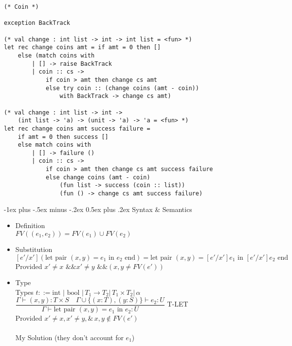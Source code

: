 \documentclass[12pt]{article}
\makeatletter
\renewcommand{\section}{\@startsection{section}{1}{0mm}%
                                    {-1ex plus -.5ex minus -.2ex}%
                                    {0.5ex plus .2ex}%
                                    {\normalfont\large\bfseries\color{header}}}
\makeatother
\begin{document}
\begin{multicols}{2}
\columnbreak

\begin{lstlisting}
(* Coin *)

exception BackTrack

(* val change : int list -> int -> int list = <fun> *)
let rec change coins amt = if amt = 0 then []
    else (match coins with 
        | [] -> raise BackTrack
        | coin :: cs ->
            if coin > amt then change cs amt
            else try coin :: (change coins (amt - coin)) 
                with BackTrack -> change cs amt)

(* val change : int list -> int -> 
    (int list -> 'a) -> (unit -> 'a) -> 'a = <fun> *)
let rec change coins amt success failure = 
    if amt = 0 then success []
    else match coins with
        | [] -> failure ()
        | coin :: cs -> 
            if coin > amt then change cs amt success failure
            else change coins (amt - coin)
                (fun list -> success (coin :: list))
                (fun () -> change cs amt success failure)
\end{lstlisting}

\section{Syntax \& Semantics}

\begin{itemize}[noitemsep, nosep]
    \item Definition \\
    $FV((e_1, e_2)) = FV(e_1) \cup FV(e_2)$
    \item Substitution \\
    $[e'/x'](\text{let pair } (x, y) = e_1 \text{ in } e_2 \text{ end}) = \text{let pair } (x, y) = [e'/x']e_1 \text{ in } [e'/x']e_2 \text{ end}$ \\
    Provided $x' \ne x \text{ \&\& } x' \ne y \text{ \&\& } (x, y \ne FV(e'))$
    \item Type \\
    Types $t ::= \text{int } \vert \text{ bool } \vert \, T_1 \rightarrow T_2 \vert \, T_1 \times T_2 \vert \, \alpha$ \\
    $\dfrac{\Gamma \vdash (x, y): T \times S \quad \Gamma \cup \{(x: T), (y: S)\} \vdash e_2: U}{\Gamma \vdash \text{let pair } (x, y) = e_1 \text{ in } e_2: U}$ T-LET \\
    Provided $x' \ne x, x' \ne y, \& \, x, y \notin FV(e')$ \\~\\
    My Solution (they don't account for $e_1$) \\


\end{itemize}
\end{multicols}
\end{document}
